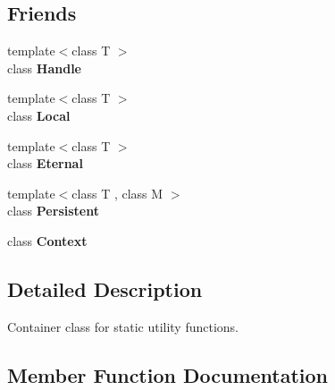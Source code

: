 \subsection*{Friends}
\begin{DoxyCompactItemize}
\item 
\hypertarget{classv8_1_1_v8_a67ca1a2d91273eaf85fb3d23ba8ce984}{}{\footnotesize template$<$class T $>$ }\\class {\bfseries Handle}\label{classv8_1_1_v8_a67ca1a2d91273eaf85fb3d23ba8ce984}

\item 
\hypertarget{classv8_1_1_v8_afb872edb4aac7ba55f0da004113aa2b0}{}{\footnotesize template$<$class T $>$ }\\class {\bfseries Local}\label{classv8_1_1_v8_afb872edb4aac7ba55f0da004113aa2b0}

\item 
\hypertarget{classv8_1_1_v8_adf5d8780aceb9310fb1246aae7ec348e}{}{\footnotesize template$<$class T $>$ }\\class {\bfseries Eternal}\label{classv8_1_1_v8_adf5d8780aceb9310fb1246aae7ec348e}

\item 
\hypertarget{classv8_1_1_v8_ad845ec8872174be0a9ca9a3dd1898d30}{}{\footnotesize template$<$class T , class M $>$ }\\class {\bfseries Persistent}\label{classv8_1_1_v8_ad845ec8872174be0a9ca9a3dd1898d30}

\item 
\hypertarget{classv8_1_1_v8_ac26c806e60ca4a0547680edb68f6e39b}{}class {\bfseries Context}\label{classv8_1_1_v8_ac26c806e60ca4a0547680edb68f6e39b}

\end{DoxyCompactItemize}


\subsection{Detailed Description}
Container class for static utility functions. 

\subsection{Member Function Documentation}
\hypertarget{classv8_1_1_v8_a3f70d920e58ac54b56f06363b5130fa3}{}
